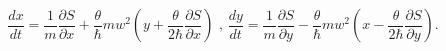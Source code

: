 \begin{equation}
\frac{dx}{dt}=\frac{1}{m}\frac{\partial S}{\partial x}+\frac{\theta}{\hbar
}mw^{2}\left(  y+\frac{\theta}{2\hbar}\frac{\partial S}{\partial x}\right)
\text{ \ \ \ , \ \ \ }\frac{dy}{dt}=\frac{1}{m}\frac{\partial S}{\partial
y}-\frac{\theta}{\hbar}mw^{2}\left(  x-\frac{\theta}{2\hbar}\frac{\partial
S}{\partial y}\right)  .\label{39}%
\end{equation}

